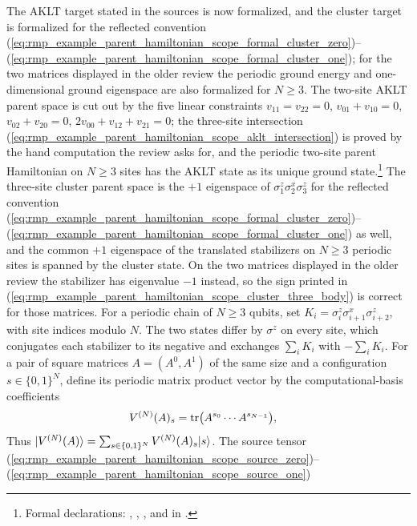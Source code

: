 \documentclass{article}
\begin{document}
The AKLT target stated in the sources is now formalized, and the cluster target
is formalized for the reflected convention
(\ref{eq:rmp_example_parent_hamiltonian_scope_formal_cluster_zero})--(\ref{eq:rmp_example_parent_hamiltonian_scope_formal_cluster_one});
for the two matrices displayed in the older review the periodic ground energy
and one-dimensional ground eigenspace are also formalized for $N\ge3$. The
two-site AKLT parent space is cut out by the five linear constraints
$v_{11}=v_{22}=0$, $v_{01}+v_{10}=0$, $v_{02}+v_{20}=0$,
$2v_{00}+v_{12}+v_{21}=0$; the three-site intersection
(\ref{eq:rmp_example_parent_hamiltonian_scope_aklt_intersection}) is proved by
the hand computation the review asks for, and the periodic two-site parent
Hamiltonian on $N\ge3$ sites has the AKLT state as its unique ground
state.\footnote{Formal declarations:
,
,
, and
 in
.} The three-site
cluster parent space is the $+1$ eigenspace of $\sigma^z_1\sigma^x_2\sigma^z_3$
for the reflected convention
(\ref{eq:rmp_example_parent_hamiltonian_scope_formal_cluster_zero})--(\ref{eq:rmp_example_parent_hamiltonian_scope_formal_cluster_one})
as well, and the common $+1$ eigenspace of the translated stabilizers on
$N\ge3$ periodic sites is spanned by the cluster state. On the two matrices
displayed in the older review the stabilizer has eigenvalue $-1$ instead, so
the sign printed in
(\ref{eq:rmp_example_parent_hamiltonian_scope_cluster_three_body}) is correct
for those matrices. For a periodic chain of $N\ge3$ qubits, set
$K_i=\sigma_i^z\sigma_{i+1}^x\sigma_{i+2}^z$, with site indices modulo $N$.
The two states differ by $\sigma^z$ on every site, which conjugates each
stabilizer to its negative and exchanges $\sum_i K_i$ with $-\sum_i K_i$.
For a pair of square matrices $A=(A^0,A^1)$ of the same size and a configuration
$s\in\{0,1\}^N$, define its periodic matrix product vector by the
computational-basis coefficients
\begin{align}
    V^{(N)}(A)_s &= \operatorname{tr}\bigl(A^{s_0}\cdots A^{s_{N-1}}\bigr),
    \label{eq:rmp_example_parent_hamiltonian_scope_mpv_coefficients}
\end{align}
Thus
$|V^{(N)}(A)\rangle=\sum_{s\in\{0,1\}^N}V^{(N)}(A)_s|s\rangle$.
The source tensor
(\ref{eq:rmp_example_parent_hamiltonian_scope_source_zero})--(\ref{eq:rmp_example_parent_hamiltonian_scope_source_one})
\end{document}
